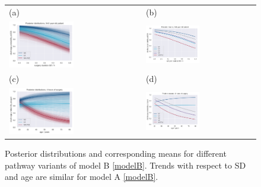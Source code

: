 \begin{figure}
    \centering
    \begin{tabular}{ll}
(a)  & (b) \\
\includegraphics[width=0.5\textwidth]{images/DS19fk1_c0__p_LoS__model_B__traces_V0_V4-12__age_mean.png}&
\includegraphics[width=0.5\textwidth]{images/DS19fk1_c0__p_LoS__model_B__mean__age_mean.pdf}\\
(c) & (d) \\
\includegraphics[width=0.5\textwidth]{images/DS19fk1_c0__p_age__model_B__traces__LoS_4h.png}&
\includegraphics[width=0.5\textwidth]{images/DS19fk1_c0__p_age__model_B__mean__LoS_4h.pdf}\\
\end{tabular}
    \caption{Posterior distributions and corresponding means for
      different pathway variants of model B \eqref{modelB}. Trends with respect to
      SD and age are similar for model A \eqref{modelB}.}
    \label{fig:posterior}
\end{figure}

